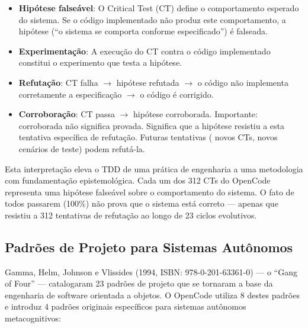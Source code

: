 \begin{itemize}
    \item \textbf{Hipótese falseável}: O Critical Test (CT) define o comportamento esperado do sistema. Se o código implementado não produz este comportamento, a hipótese (``o sistema se comporta conforme especificado'') é falseada.
    \item \textbf{Experimentação}: A execução do CT contra o código implementado constitui o experimento que testa a hipótese.
    \item \textbf{Refutação}: CT falha $\rightarrow$ hipótese refutada $\rightarrow$ o código não implementa corretamente a especificação $\rightarrow$ o código é corrigido.
    \item \textbf{Corroboração}: CT passa $\rightarrow$ hipótese corroborada. Importante: corroborada não significa provada. Significa que a hipótese resistiu a esta tentativa específica de refutação. Futuras tentativas ( novos CTs, novos cenários de teste) podem refutá-la.
\end{itemize}

Esta interpretação eleva o TDD de uma prática de engenharia a uma metodologia com fundamentação epistemológica. Cada um dos 312 CTs do OpenCode representa uma hipótese falseável sobre o comportamento do sistema. O fato de todos passarem (100\%) não prova que o sistema está correto — apenas que resistiu a 312 tentativas de refutação ao longo de 23 ciclos evolutivos.

\subsection{Padrões de Projeto para Sistemas Autônomos}

Gamma, Helm, Johnson e Vlissides (1994, ISBN: 978-0-201-63361-0) — o ``Gang of Four'' — catalogaram 23 padrões de projeto que se tornaram a base da engenharia de software orientada a objetos. O OpenCode utiliza 8 destes padrões e introduz 4 padrões originais específicos para sistemas autônomos metacognitivos:

